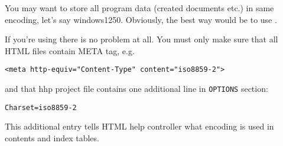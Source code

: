 
You may want to store all program data (created documents etc.) in
same encoding, let's say windows1250. Obviously, the best way would
be to use .





If you're using  there is
no problem at all. You must only make sure that all HTML files contain
META tag, e.g.

\begin{verbatim}
<meta http-equiv="Content-Type" content="iso8859-2">
\end{verbatim}

and that hhp project file contains one additional line in {\tt OPTIONS}
section:

\begin{verbatim}
Charset=iso8859-2
\end{verbatim}

This additional entry tells HTML help controller what encoding is used
in contents and index tables.
